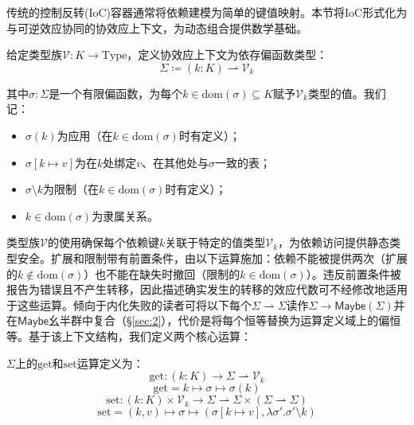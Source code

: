 传统的控制反转(IoC)容器\cite{ref38}通常将依赖建模为简单的键值映射。本节将IoC形式化为与可逆效应协同的协效应上下文，为动态组合提供数学基础。

\begin{definition}\label{def:3.22}
给定类型族$\mathcal{V}: K \to \mathrm{Type}$，定义协效应上下文为依存偏函数类型：
\begin{equation}\label{eq:3.20}
\Sigma \coloneqq (k: K) \rightharpoonup \mathcal{V}_k
\end{equation}
\end{definition}

其中$\sigma: \Sigma$是一个有限偏函数，为每个$k \in \mathrm{dom}(\sigma) \subseteq K$赋予$\mathcal{V}_k$类型的值。我们记：
\begin{itemize}
\item $\sigma(k)$为应用（在$k \in \mathrm{dom}(\sigma)$时有定义）；
\item $\sigma[k \mapsto v]$为在$k$处绑定$v$、在其他处与$\sigma$一致的表；
\item $\sigma \setminus k$为限制（在$k \in \mathrm{dom}(\sigma)$时有定义）；
\item $k \in \mathrm{dom}(\sigma)$为隶属关系。
\end{itemize}

类型族$\mathcal{V}$的使用确保每个依赖键$k$关联于特定的值类型$\mathcal{V}_k$，为依赖访问提供静态类型安全。扩展和限制带有前置条件，由以下运算施加：依赖不能被提供两次（扩展的$k \notin \mathrm{dom}(\sigma)$）也不能在缺失时撤回（限制的$k \in \mathrm{dom}(\sigma)$）。违反前置条件被报告为错误且不产生转移，因此描述确实发生的转移的效应代数可不经修改地适用于这些运算。倾向于内化失败的读者可将以下每个$\Sigma \rightharpoonup \Sigma$读作$\Sigma \to \mathsf{Maybe}(\Sigma)$并在$\mathsf{Maybe}$幺半群中复合（\S\ref{sec:2}），代价是将每个恒等替换为运算定义域上的偏恒等。基于该上下文结构，我们定义两个核心运算：

\begin{definition}\label{def:3.23}
$\Sigma$上的$\mathrm{get}$和$\mathrm{set}$运算定义为：
\begin{equation}\label{eq:3.21}
\mathrm{get} : (k: K) \to \Sigma \rightharpoonup \mathcal{V}_k
\end{equation}
\[
\mathrm{get} = k \mapsto \sigma \mapsto \sigma(k)
\]
\[
\mathrm{set} : (k: K) \times \mathcal{V}_k \to \Sigma \rightharpoonup \Sigma \times (\Sigma \rightharpoonup \Sigma)
\]
\[
\mathrm{set} = (k, v) \mapsto \sigma \mapsto (\sigma[k \mapsto v], \lambda\sigma'.\sigma' \setminus k)
\]
\end{definition}

